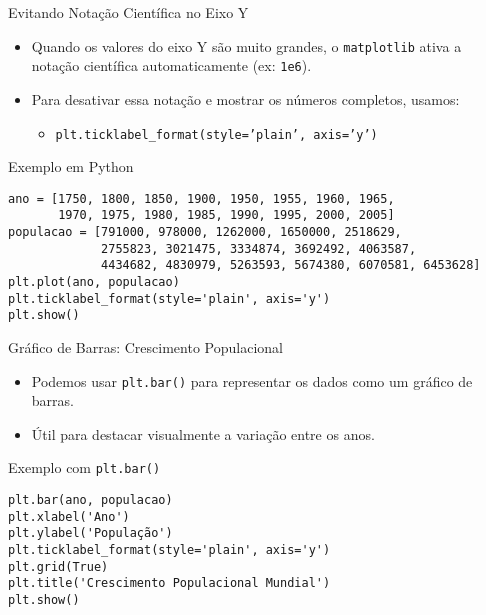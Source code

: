 \begin{frame}[fragile]{Evitando Notação Científica no Eixo Y}
    \begin{itemize}
        \item Quando os valores do eixo Y são muito grandes, o \texttt{matplotlib} ativa a notação científica automaticamente (ex: \texttt{1e6}).
        \item Para desativar essa notação e mostrar os números completos, usamos:
        \begin{itemize}
            \item \texttt{plt.ticklabel\_format(style='plain', axis='y')}
        \end{itemize}
        
    \end{itemize}

    \begin{block}{Exemplo em Python}
\begin{verbatim}
ano = [1750, 1800, 1850, 1900, 1950, 1955, 1960, 1965,
       1970, 1975, 1980, 1985, 1990, 1995, 2000, 2005]
populacao = [791000, 978000, 1262000, 1650000, 2518629,
             2755823, 3021475, 3334874, 3692492, 4063587,
             4434682, 4830979, 5263593, 5674380, 6070581, 6453628]
plt.plot(ano, populacao)
plt.ticklabel_format(style='plain', axis='y')  
plt.show()
\end{verbatim}
    \end{block}
\end{frame}



\begin{frame}[fragile]{Gráfico de Barras: Crescimento Populacional}
    \begin{itemize}
        \item Podemos usar \texttt{plt.bar()} para representar os dados como um gráfico de barras.
        \item Útil para destacar visualmente a variação entre os anos.
    \end{itemize}

    \begin{block}{Exemplo com \texttt{plt.bar()}}
\begin{verbatim}
plt.bar(ano, populacao)
plt.xlabel('Ano')
plt.ylabel('População')
plt.ticklabel_format(style='plain', axis='y')
plt.grid(True)
plt.title('Crescimento Populacional Mundial')
plt.show()
\end{verbatim}
    \end{block}
\end{frame}

